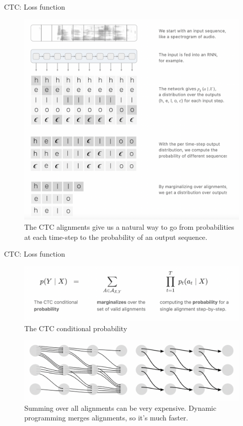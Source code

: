 \begin{frame}{CTC: Loss function}
    \begin{figure}
    	\centering
    	\includegraphics[width=0.7\linewidth]{figs/ctc_main.png}
    	\caption{The CTC alignments give us a natural way to go from probabilities at each time-step to the probability of an output sequence.}

    \end{figure}
\end{frame}
\begin{frame}{CTC: Loss function}
    \begin{figure}
    	\centering
    	\includegraphics[width=0.99\linewidth]{figs/ctc_loss.png}
    	\caption{The CTC conditional probability}
    \end{figure}
  
      \begin{figure}
    	\centering
    	\includegraphics[width=0.99\linewidth]{figs/computation_problem_ctc.png}
    	\caption{Summing over all alignments can be very expensive. Dynamic programming merges alignments, so it’s much faster.}
    \end{figure}  

\end{frame}
